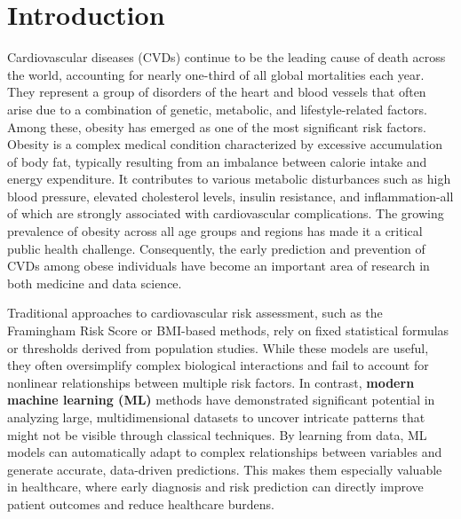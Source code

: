 \chapter{Introduction}\label{ch:introduction}


Cardiovascular diseases (CVDs) continue to be the leading cause of death across the world, accounting for nearly one-third of all global mortalities each year.
They represent a group of disorders of the heart and blood vessels that often arise due to a combination of genetic, metabolic, and lifestyle-related factors.
Among these, obesity has emerged as one of the most significant risk factors.
Obesity is a complex medical condition characterized by excessive accumulation of body fat, typically resulting from an imbalance between calorie intake and energy expenditure.
It contributes to various metabolic disturbances such as high blood pressure, elevated cholesterol levels, insulin resistance, and inflammation-all of which are strongly associated with cardiovascular complications.
The growing prevalence of obesity across all age groups and regions has made it a critical public health challenge.
Consequently, the early prediction and prevention of CVDs among obese individuals have become an important area of research in both medicine and data science.

Traditional approaches to cardiovascular risk assessment, such as the Framingham Risk Score or BMI-based methods, rely on fixed statistical formulas or thresholds derived from population studies.
While these models are useful, they often oversimplify complex biological interactions and fail to account for nonlinear relationships between multiple risk factors.
In contrast, \textbf{modern machine learning (ML)} methods have demonstrated significant potential in analyzing large, multidimensional datasets to uncover intricate patterns that might not be visible through classical techniques.
By learning from data, ML models can automatically adapt to complex relationships between variables and generate accurate, data-driven predictions.
This makes them especially valuable in healthcare, where early diagnosis and risk prediction can directly improve patient outcomes and reduce healthcare burdens.

